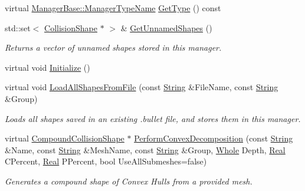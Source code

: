 \begin{DoxyCompactItemize}
virtual \hyperlink{classMezzanine_1_1ManagerBase_a08cecf5169cad3e82be81a3a159b0b6e}{ManagerBase::ManagerTypeName} \hyperlink{classMezzanine_1_1CollisionShapeManager_a4b98446e667a402e675eec79353e5278}{GetType} () const 
\item 
std::set$<$ \hyperlink{classMezzanine_1_1CollisionShape}{CollisionShape} $\ast$ $>$ \& \hyperlink{classMezzanine_1_1CollisionShapeManager_aebc9b1d42e5c4bc0d69afb3fca7ace1e}{GetUnnamedShapes} ()
\begin{DoxyCompactList}\small\item\em Returns a vector of unnamed shapes stored in this manager. \item\end{DoxyCompactList}\item 
virtual void \hyperlink{classMezzanine_1_1CollisionShapeManager_a15ddc7bb06cf1cf32cd4e641d3b7b34f}{Initialize} ()
\item 
virtual void \hyperlink{classMezzanine_1_1CollisionShapeManager_af76b90ccca8183a6ddfc33b7a4e65773}{LoadAllShapesFromFile} (const \hyperlink{namespaceMezzanine_acf9fcc130e6ebf08e3d8491aebcf1c86}{String} \&FileName, const \hyperlink{namespaceMezzanine_acf9fcc130e6ebf08e3d8491aebcf1c86}{String} \&Group)
\begin{DoxyCompactList}\small\item\em Loads all shapes saved in an existing .bullet file, and stores them in this manager. \item\end{DoxyCompactList}\item 
virtual \hyperlink{classMezzanine_1_1CompoundCollisionShape}{CompoundCollisionShape} $\ast$ \hyperlink{classMezzanine_1_1CollisionShapeManager_a639aa9c6c09f859dea4a200feb50528b}{PerformConvexDecomposition} (const \hyperlink{namespaceMezzanine_acf9fcc130e6ebf08e3d8491aebcf1c86}{String} \&Name, const \hyperlink{namespaceMezzanine_acf9fcc130e6ebf08e3d8491aebcf1c86}{String} \&MeshName, const \hyperlink{namespaceMezzanine_acf9fcc130e6ebf08e3d8491aebcf1c86}{String} \&Group, \hyperlink{namespaceMezzanine_adcbb6ce6d1eb4379d109e51171e2e493}{Whole} Depth, \hyperlink{namespaceMezzanine_a726731b1a7df72bf3583e4a97282c6f6}{Real} CPercent, \hyperlink{namespaceMezzanine_a726731b1a7df72bf3583e4a97282c6f6}{Real} PPercent, bool UseAllSubmeshes=false)
\begin{DoxyCompactList}\small\item\em Generates a compound shape of Convex Hulls from a provided mesh. \item\end{DoxyCompactList}\item 

\end{DoxyCompactItemize}
